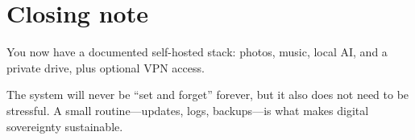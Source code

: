 
\section{Closing note}
You now have a documented self-hosted stack:
photos, music, local AI, and a private drive, plus optional VPN access.

The system will never be ``set and forget'' forever, but it also does not need to be stressful.
A small routine---updates, logs, backups---is what makes digital sovereignty sustainable. 